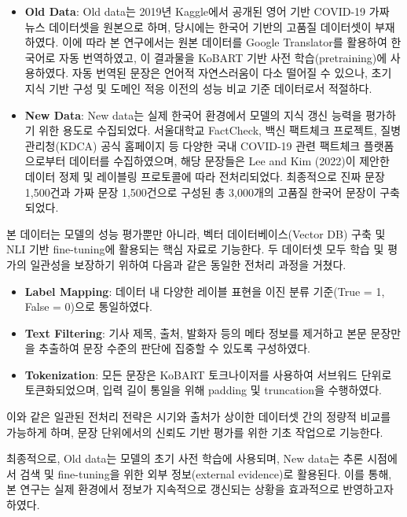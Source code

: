 \documentclass[a4paper,fleqn]{cas-sc}
\begin{document}
\begin{itemize}
    \item{\textbf{Old Data}:
    Old data는 2019년 Kaggle에서 공개된 영어 기반 COVID-19 가짜 뉴스 데이터셋을 원본으로 하며, 당시에는 한국어 기반의 고품질 데이터셋이 부재하였다. 이에 따라 본 연구에서는 원본 데이터를 Google Translator를 활용하여 한국어로 자동 번역하였고, 이 결과물을 KoBART 기반 사전 학습(pretraining)에 사용하였다.
자동 번역된 문장은 언어적 자연스러움이 다소 떨어질 수 있으나, 초기 지식 기반 구성 및 도메인 적응 이전의 성능 비교 기준 데이터로서 적절하다.}
    \item{\textbf{New Data}:
    New data는 실제 한국어 환경에서 모델의 지식 갱신 능력을 평가하기 위한 용도로 수집되었다. 서울대학교 FactCheck, 백신 팩트체크 프로젝트, 질병관리청(KDCA) 공식 홈페이지 등 다양한 국내 COVID-19 관련 팩트체크 플랫폼으로부터 데이터를 수집하였으며, 해당 문장들은 Lee and Kim (2022)이 제안한 데이터 정제 및 레이블링 프로토콜에 따라 전처리되었다. 최종적으로 진짜 문장 1,500건과 가짜 문장 1,500건으로 구성된 총 3,000개의 고품질 한국어 문장이 구축되었다.}
    
\end{itemize}  

본 데이터는 모델의 성능 평가뿐만 아니라, 벡터 데이터베이스(Vector DB) 구축 및 NLI 기반 fine-tuning에 활용되는 핵심 자료로 기능한다.
두 데이터셋 모두 학습 및 평가의 일관성을 보장하기 위하여 다음과 같은 동일한 전처리 과정을 거쳤다.

\begin{itemize}
    \item{\textbf{Label Mapping}:
    데이터 내 다양한 레이블 표현을 이진 분류 기준(True = 1, False = 0)으로 통일하였다.}
    \item{\textbf{Text Filtering}:
    기사 제목, 출처, 발화자 등의 메타 정보를 제거하고 본문 문장만을 추출하여 문장 수준의 판단에 집중할 수 있도록 구성하였다.}
    \item{\textbf{Tokenization}: 
    모든 문장은 KoBART 토크나이저를 사용하여 서브워드 단위로 토큰화되었으며, 입력 길이 통일을 위해 padding 및 truncation을 수행하였다.
    }
\end{itemize}  

이와 같은 일관된 전처리 전략은 시기와 출처가 상이한 데이터셋 간의 정량적 비교를 가능하게 하며, 문장 단위에서의 신뢰도 기반 평가를 위한 기초 작업으로 기능한다.

최종적으로, Old data는 모델의 초기 사전 학습에 사용되며, New data는 추론 시점에서 검색 및 fine-tuning을 위한 외부 정보(external evidence)로 활용된다. 이를 통해, 본 연구는 실제 환경에서 정보가 지속적으로 갱신되는 상황을 효과적으로 반영하고자 하였다.
\end{document}
